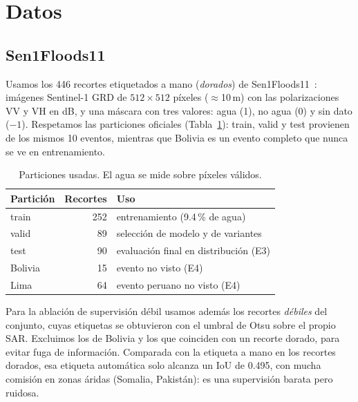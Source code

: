 \section{Datos}
\label{sec:datos}

\subsection{Sen1Floods11}
Usamos los 446 recortes etiquetados a mano (\emph{dorados}) de
Sen1Floods11~\cite{bonafilia2020sen1floods11}: imágenes Sentinel-1 GRD de $512\times512$
píxeles ($\approx$10\,m) con las polarizaciones VV y VH en dB, y una máscara con tres valores:
agua (1), no agua (0) y sin dato ($-1$). Respetamos las particiones oficiales
(Tabla~\ref{tab:particiones}): train, valid y test provienen de los mismos 10 eventos, mientras
que Bolivia es un evento completo que nunca se ve en entrenamiento.

\begin{table}[t]
\centering
\caption{Particiones usadas. El agua se mide sobre píxeles válidos.}
\label{tab:particiones}
\begin{tabular}{lrl}
\toprule
Partición & Recortes & Uso \\
\midrule
train   & 252 & entrenamiento (9.4\,\% de agua) \\
valid   &  89 & selección de modelo y de variantes \\
test    &  90 & evaluación final en distribución (E3) \\
Bolivia &  15 & evento no visto (E4) \\
Lima    &  64 & evento peruano no visto (E4) \\
\bottomrule
\end{tabular}
\end{table}

Para la ablación de supervisión débil usamos además los recortes \emph{débiles} del conjunto,
cuyas etiquetas se obtuvieron con el umbral de Otsu sobre el propio SAR. Excluimos los de
Bolivia y los que coinciden con un recorte dorado, para evitar fuga de información. Comparada
con la etiqueta a mano en los recortes dorados, esa etiqueta automática solo alcanza un IoU de
0.495, con mucha comisión en zonas áridas (Somalia, Pakistán): es una supervisión
barata pero ruidosa.

